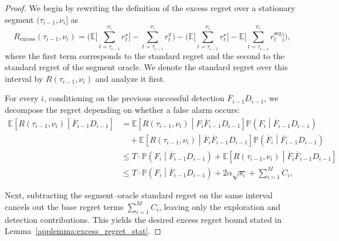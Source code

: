 \documentclass[twoside]{article}
\theoremstyle{plain}
\theoremstyle{definition}
\theoremstyle{remark}
\begin{document}
\begin{proof}
We begin by rewriting the definition of the excess regret over a stationary segment $(\tau_{i-1}, \nu_i]$ as
\[
R_{\mathrm{excess}}\!\left(\tau_{i-1},\nu_{i}\right)
= \Bigg(\mathbb{E}\Big[\textstyle\sum_{t=\tau_{i-1}}^{\nu_{i}} r_t^{\star}\Big] - \textstyle\sum_{t=\tau_{i-1}}^{\nu_{i}} r_t^{\pi}\Bigg)
 - \Bigg(\mathbb{E}\Big[\textstyle\sum_{t=\tau_{i-1}}^{\nu_{i}} r_t^{\star}\Big] - \mathbb{E}\Big[\textstyle\sum_{t=\tau_{i-1}}^{\nu_{i}} r_t^{\mathrm{seg}}\Big]\Bigg),
\]
where the first term corresponds to the standard regret and the second to the standard regret of the segment oracle.  
We denote the standard regret over this interval by $R(\tau_{i-1},\nu_{i})$ and analyze it first.

For every $i$, conditioning on the previous successful detection $\overline{F}_{i-1} D_{i-1}$, we decompose the regret depending on whether a false alarm occurs:
\begin{subequations}
\begin{align}
    \mathbb{E}\!\left[R\left(\tau_{i-1},\nu_{i}\right)\middle|\overline{F}_{i-1}D_{i-1} \right]
    &=\mathbb{E}\!\left[R\left(\tau_{i-1},\nu_{i}\right)\middle|F_{i}\overline{F}_{i-1}D_{i-1}\right]\mathbb{P}\!\left(F_{i}\middle|\overline{F}_{i-1}D_{i-1}\right) \\
    &\quad+\mathbb{E}\!\left[R\left(\tau_{i-1},\nu_{i}\right)\middle|\overline{F}_{i}\overline{F}_{i-1}D_{i-1}\right]\mathbb{P}\!\left(\overline{F}_{i}\middle|\overline{F}_{i-1}D_{i-1}\right)\\
    &\leq T\cdot \mathbb{P}\!\left(F_{i}\middle|\overline{F}_{i-1}D_{i-1}\right)+\mathbb{E}\!\left[R\left(\tau_{i-1},\nu_{i}\right)\middle|\overline{F}_{i}\overline{F}_{i-1}D_{i-1}\right]\\
    &\leq T\cdot \mathbb{P}\!\left(F_{i}\middle|\overline{F}_{i-1}D_{i-1}\right)+2\alpha\sqrt{s_{i}}+\sum_{i=1}^M C_i, \label{eqn:regret_seg}
\end{align}
\end{subequations}

Next, subtracting the segment–oracle standard regret on the same interval cancels out the base regret terms $\sum_{i=1}^M C_i$, leaving only the exploration and detection contributions. This yields the desired excess regret bound stated in Lemma~\ref{applemma:excess_regret_stat}.
    
\end{proof}
\end{document}
